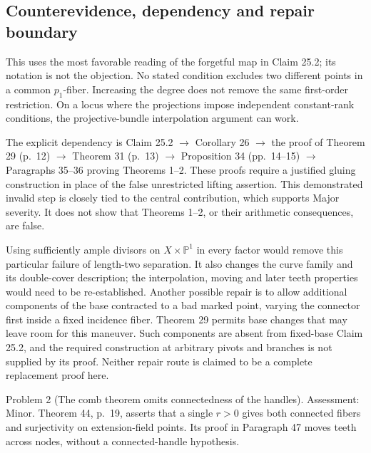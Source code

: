\documentclass[10pt]{article}
\begin{document}
\subsection*{Counterevidence, dependency and repair boundary}
This uses the most favorable reading of the forgetful map in Claim 25.2; its notation is not the objection. No stated condition excludes two different points in a common \(p_1\)-fiber. Increasing the degree does not remove the same first-order restriction. On a locus where the projections impose independent constant-rank conditions, the projective-bundle interpolation argument can work.\par
The explicit dependency is Claim 25.2 \(\to\) Corollary 26 \(\to\) the proof of Theorem 29 (p. 12) \(\to\) Theorem 31 (p. 13) \(\to\) Proposition 34 (pp. 14–15) \(\to\) Paragraphs 35–36 proving Theorems 1–2. These proofs require a justified gluing construction in place of the false unrestricted lifting assertion. This demonstrated invalid step is closely tied to the central contribution, which supports Major severity. It does not show that Theorems 1–2, or their arithmetic consequences, are false.\par
Using sufficiently ample divisors on \(X\times\mathbb P^1\) in every factor would remove this particular failure of length-two separation. It also changes the curve family and its double-cover description; the interpolation, moving and later teeth properties would need to be re-established. Another possible repair is to allow additional components of the base contracted to a bad marked point, varying the connector first inside a fixed incidence fiber. Theorem 29 permits base changes that may leave room for this maneuver. Such components are absent from fixed-base Claim 25.2, and the required construction at arbitrary pivots and branches is not supplied by its proof. Neither repair route is claimed to be a complete replacement proof here.\par
Problem 2 (The comb theorem omits connectedness of the handles).  Assessment: Minor. Theorem 44, p. 19, asserts that a single \(r>0\) gives both connected fibers and surjectivity on extension-field points. Its proof in Paragraph 47 moves teeth across nodes, without a connected-handle hypothesis.\par
\end{document}
